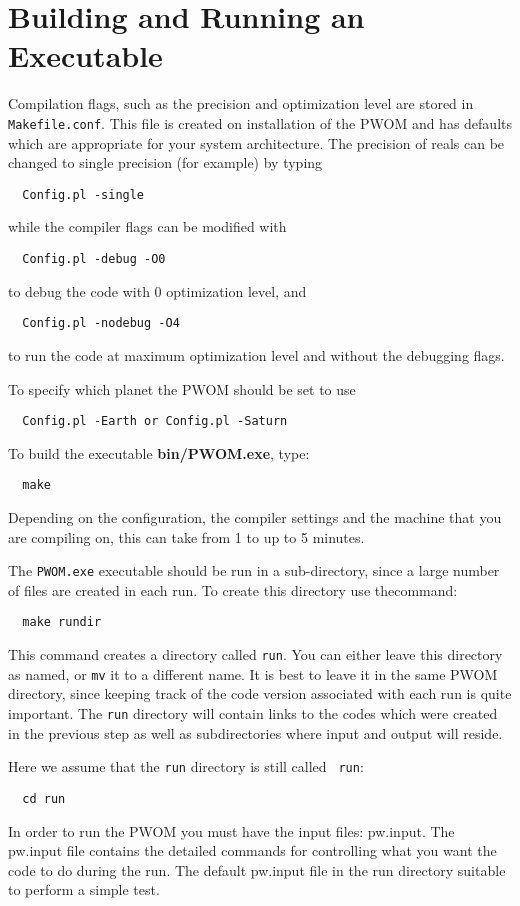 \section{Building and Running an Executable}


Compilation flags, such as the precision and optimization 
level are stored in {\tt Makefile.conf}. This file is created on
installation of the PWOM and has defaults which are appropriate for
your system architecture.  The precision of reals
can be changed to single precision (for example) by typing
\begin{verbatim}
  Config.pl -single
\end{verbatim}
while the compiler flags can be modified with
\begin{verbatim}
  Config.pl -debug -O0
\end{verbatim}
to debug the code with 0 optimization level, and
\begin{verbatim}
  Config.pl -nodebug -O4
\end{verbatim}
to run the code at maximum optimization level and without the debugging flags.

To specify which planet the PWOM should be set to use 
\begin{verbatim}
  Config.pl -Earth or Config.pl -Saturn
\end{verbatim}


To build the executable {\bf bin/PWOM.exe}, type:
\begin{verbatim}
  make
\end{verbatim} 
Depending on the configuration, the compiler settings and the machine 
that you are compiling on, this can take from 1 to up to 5 minutes.  

The {\tt PWOM.exe} executable should be run in a sub-directory, since a 
large number of files are created in each run.  
To create this directory use thecommand:
\begin{verbatim}
  make rundir
\end{verbatim} 
This command creates a directory called {\tt run}.  You can either
leave this directory as named, or {\tt mv} it to a different name.  It
is best to leave it in the same PWOM directory, since
keeping track of the code version associated with each run is quite
important.  The {\tt run} directory will contain links to the codes
which were created in the previous step as well as subdirectories
where input and output will reside.

Here we assume that the {\tt run} directory is still called {\tt
run}:
\begin{verbatim}
  cd run
\end{verbatim}
In order to run the PWOM you must have the input files: 
pw.input. The pw.input 
file contains the detailed commands for controlling what you want the
code to do during the run.  The default pw.input 
file in the run directory  suitable to perform a simple test.

